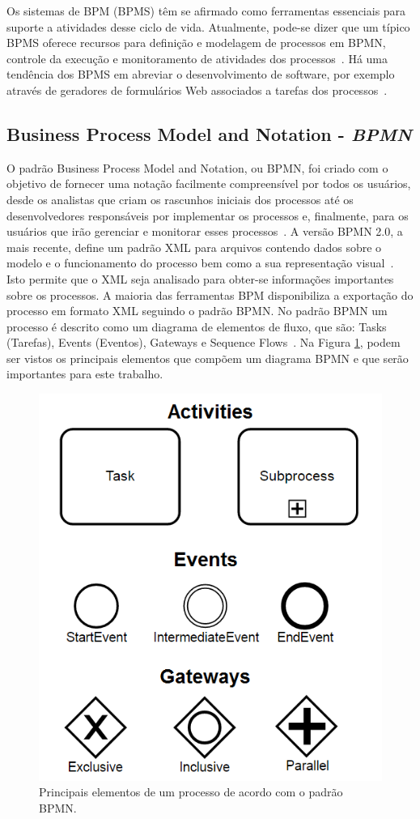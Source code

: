 \documentclass[12pt]{article}
\begin{document}
Os sistemas de BPM (BPMS) têm se afirmado como ferramentas essenciais para suporte a atividades desse ciclo de vida. Atualmente, pode-se dizer que um típico BPMS oferece recursos para definição e modelagem de processos em BPMN, controle da execução e monitoramento de atividades dos processos~\cite{forrester}. Há uma tendência dos BPMS em abreviar o desenvolvimento de software, por exemplo através de geradores de formulários Web associados a tarefas dos processos~\cite{greenresearch}. 

\subsection{Business Process Model and Notation - \emph{BPMN}}
O padrão Business Process Model and Notation, ou BPMN, foi criado com o objetivo de fornecer uma notação facilmente compreensível por todos os usuários, desde os analistas que criam os rascunhos iniciais dos processos até os desenvolvedores responsáveis por implementar os processos e, finalmente, para os usuários que irão gerenciar e monitorar esses processos~\cite{model2011notation}. A versão BPMN 2.0, a mais recente, define um padrão XML para arquivos contendo dados sobre o modelo e o funcionamento do processo bem como a sua representação visual~\cite{kurzdiagram}. Isto permite que o XML seja analisado para obter-se informações importantes sobre os processos. A maioria das ferramentas BPM disponibiliza a exportação do processo em formato XML seguindo o padrão BPMN. No padrão BPMN um processo é descrito como um diagrama de elementos de fluxo, que são: Tasks (Tarefas), Events (Eventos), Gateways e Sequence Flows~\cite{kurzdiagram}. Na Figura \ref{fig:bpmn}, podem ser vistos os principais elementos que compõem um diagrama BPMN e que serão importantes para este trabalho.

\begin{figure}[ht]
\centering
\includegraphics[width=.5\textwidth]{figuras/bpmn.png}
\caption{Principais elementos de um processo de acordo com o padrão BPMN.}
\label{fig:bpmn}
\end{figure}
\end{document}
